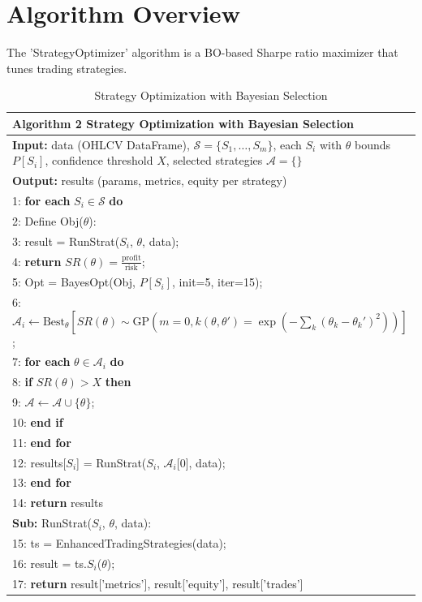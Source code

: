 \section{Algorithm Overview}
The 'StrategyOptimizer' algorithm is a BO-based Sharpe ratio maximizer that tunes trading strategies. 

\begin{table}[h]
\small
\centering
\begin{tabular}{|p{10cm}|}
\hline
\textbf{Algorithm 2 Strategy Optimization with Bayesian Selection} \\
\hline
\textbf{Input:} data (OHLCV DataFrame), $\mathcal{S} = \{ S_1, \ldots, S_m \}$, each $S_i$ with $\theta$ bounds $P[S_i]$, confidence threshold $X$, selected strategies $\mathcal{A} = \{ \}$ \\
\textbf{Output:} results (params, metrics, equity per strategy) \\
\hline
1: \textbf{for each} $S_i \in \mathcal{S}$ \textbf{do} \\
2: \quad Define Obj($\theta$): \\
3: \quad\quad result = RunStrat($S_i$, $\theta$, data); \\
4: \quad\quad \textbf{return} $SR(\theta) = \frac{\text{profit}}{\text{risk}}$; \\
5: \quad Opt = BayesOpt(Obj, $P[S_i]$, init=5, iter=15); \\
6: \quad $\mathcal{A}_i \leftarrow \text{Best}_\theta \left[ SR(\theta) \sim \text{GP}(m=0, k(\theta, \theta')=\exp(-\sum_k (\theta_k - \theta_k')^2)) \right]$; \\
7: \quad \textbf{for each} $\theta \in \mathcal{A}_i$ \textbf{do} \\
8: \quad\quad \textbf{if} $SR(\theta) > X$ \textbf{then} \\
9: \quad\quad\quad $\mathcal{A} \leftarrow \mathcal{A} \cup \{ \theta \}$; \\
10: \quad\quad \textbf{end if} \\
11: \quad \textbf{end for} \\
12: \quad results[$S_i$] = RunStrat($S_i$, $\mathcal{A}_i$[0], data); \\
13: \textbf{end for} \\
14: \textbf{return} results \\
\textbf{Sub:} RunStrat($S_i$, $\theta$, data): \\
15: \quad ts = EnhancedTradingStrategies(data); \\
16: \quad result = ts.$S_i$($\theta$); \\
17: \quad \textbf{return} result['metrics'], result['equity'], result['trades'] \\
\hline
\end{tabular}
\caption{Strategy Optimization with Bayesian Selection}
\label{tab:strategy_optimizer}
\end{table}


